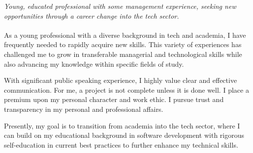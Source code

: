 
\vspace{-1.3em} %

\begin{multicols}{2}  %
\noindent \textit{Young, educated professional with some management experience, seeking new opportunities through a career change into the tech sector.}\\\\

As a young professional with a diverse background in tech and academia, I have frequently needed to rapidly acquire new skills. This variety of experiences has challenged me to grow in transferable managerial and technological skills while also advancing my knowledge within specific fields of study.

With significant public speaking experience, I highly value clear and effective communication. For me, a project is not complete unless it is done well. I place a premium upon my personal character and work ethic. I pursue trust and transparency in my personal and professional affairs.

Presently, my goal is to transition from academia into the tech sector, where I can build on my educational background in software development with rigorous self-education in current best practices to further enhance my technical skills.

\end{multicols}

